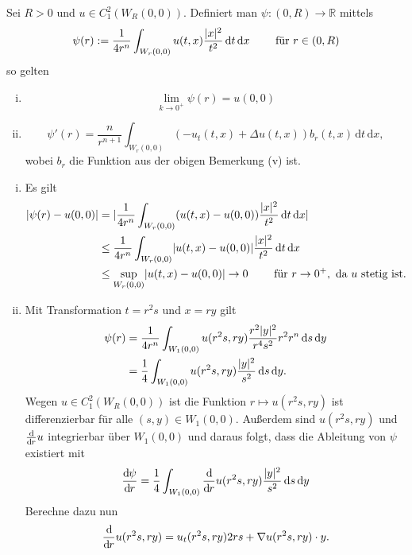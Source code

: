 \begin{lemma}
	Sei $R >0$ und $u \in C^2_1(W_R(0,0))$. Definiert man $\psi : (0,R) \to \mathbb{R}$ mittels
	\[
		\psi(r) := \frac{1}{4 r^n} \int_{W_r(0,0)}^{} u(t,x) \frac{\lvert x\rvert^2}{t^2} \,\mathrm{d}t \,\mathrm{d}x \qquad \text{ für } r \in (0,R)
	\]
	so gelten
	\begin{enumerate}[(i)]
		\item \[
			\lim_{k \to 0^+} \psi(r) = u(0,0)
		\]
		\item \[
			\psi'(r) = \frac{n}{r^{n+1}} \int_{W_r(0,0)}^{} (-u_t(t,x)+ \Delta u(t,x))b_r(t,x) \,\mathrm{d}t \,\mathrm{d}x,
		\] wobei $b_r$ die Funktion aus der obigen Bemerkung (v) ist.
	\end{enumerate}
\end{lemma}
\begin{beweis}
	\begin{enumerate}[(i)]
		\item Es gilt
		\begin{align*}
			\lvert \psi(r) - u(0,0)\rvert &= \lvert \frac{1}{4r^n} \int_{W_r(0,0)}^{} (u(t,x)- u(0,0)) \frac{\lvert x\rvert^2}{t^2} \,\mathrm{d}t \, \mathrm{d}x\rvert \\
			& \leq \frac{1}{4 r^n} \int_{W_r(0,0)}^{} \lvert u(t,x)-u(0,0)\rvert \frac{\lvert x\rvert^2}{t^2} \,\mathrm{d}t \, \mathrm{d}x \\
			& \leq \sup_{W_r(0,0)} \lvert u(t,x)-u(0,0)\rvert \to 0 \qquad \text{ für } r \to 0^+, \text{ da } u \text{ stetig ist.}
		\end{align*}
		\item Mit Transformation $t= r^2 s$ und $x = ry$ gilt
		\begin{align*}
			\psi(r) &= \frac{1}{4 r^n} \int_{W_1(0,0)}^{}u(r^2s,ry) \frac{r^2 \lvert y\rvert^2}{r^4 s^2} r^2 r^n \,\mathrm{d}s \,\mathrm{d}y \\
			&= \frac{1}{4} \int_{W_1(0,0)}^{} u(r^2s,ry) \frac{\lvert y\rvert^2}{s^2} \,\mathrm{d}s \,\mathrm{d}y.
		\end{align*}
		Wegen $u \in C^2_1(W_R(0,0))$ ist die Funktion $r \mapsto  u(r^2s,ry)$ ist differenzierbar für alle $(s,y) \in W_1(0,0)$. Außerdem sind
		$u(r^2s,ry)$ und $\frac{\mathrm{d}\mkern-1.0mu }{\mathrm{d}\mkern-1.0mu r} u$ integrierbar über $W_1(0,0)$ und daraus folgt, dass die Ableitung von $\psi$ existiert mit
		\[
			\frac{\mathrm{d}\mkern-1.0mu \psi}{\mathrm{d}\mkern-1.0mu r}  = \frac{1}{4} \int_{W_1(0,0)}^{} \frac{\mathrm{d}\mkern-1.0mu }{\mathrm{d}\mkern-1.0mu r}  u(r^2s,ry) \frac{\lvert y\rvert^2}{s^2} \,\mathrm{d}s \,\mathrm{d}y
		\]
		Berechne dazu nun
		\begin{align*}
			\frac{\mathrm{d}\mkern-1.0mu }{\mathrm{d}\mkern-1.0mu r} u(r^2s,ry) = u_t(r^2s,ry)2rs+  \nabla u(r^2s,ry)\cdot y.
		\end{align*}

\end{enumerate}
\end{beweis}
